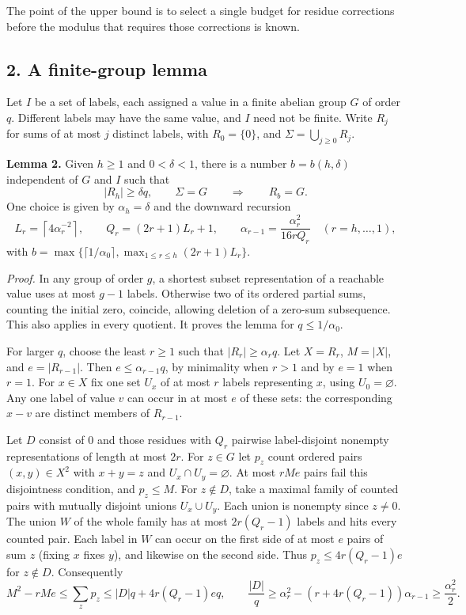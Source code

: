 \documentclass[
  11pt,
]{article}
\begin{document}
The point of the upper bound is to select a single budget for residue
corrections before the modulus that requires those corrections is known.

\subsection{2. A finite-group lemma}\label{a-finite-group-lemma}

Let \(I\) be a set of labels, each assigned a value in a finite abelian
group \(G\) of order \(q\). Different labels may have the same value,
and \(I\) need not be finite. Write \(R_j\) for sums of at most \(j\)
distinct labels, with \(R_0=\{0\}\), and \(\Sigma=\bigcup_{j\ge0}R_j\).

\textbf{Lemma 2.} Given \(h\ge1\) and \(0<\delta<1\), there is a number
\(b=b(h,\delta)\) independent of \(G\) and \(I\) such that \[
|R_h|\ge\delta q,\qquad \Sigma=G\qquad\Longrightarrow\qquad R_b=G.
\] One choice is given by \(\alpha_h=\delta\) and the downward recursion
\[
L_r=\left\lceil4\alpha_r^{-2}\right\rceil,\qquad
Q_r=(2r+1)L_r+1,\qquad
\alpha_{r-1}=\frac{\alpha_r^2}{16rQ_r}\quad(r=h,\ldots,1),
\] with
\(b=\max\{\lceil1/\alpha_0\rceil,\max_{1\le r\le h}(2r+1)L_r\}\).

\emph{Proof.} In any group of order \(g\), a shortest subset
representation of a reachable value uses at most \(g-1\) labels.
Otherwise two of its ordered partial sums, counting the initial zero,
coincide, allowing deletion of a zero-sum subsequence. This also applies
in every quotient. It proves the lemma for \(q\le1/\alpha_0\).

For larger \(q\), choose the least \(r\ge1\) such that
\(|R_r|\ge\alpha_r q\). Let \(X=R_r\), \(M=|X|\), and \(e=|R_{r-1}|\).
Then \(e\le\alpha_{r-1}q\), by minimality when \(r>1\) and by \(e=1\)
when \(r=1\). For \(x\in X\) fix one set \(U_x\) of at most \(r\) labels
representing \(x\), using \(U_0=\varnothing\). Any one label of value
\(v\) can occur in at most \(e\) of these sets: the corresponding
\(x-v\) are distinct members of \(R_{r-1}\).

Let \(D\) consist of \(0\) and those residues with \(Q_r\) pairwise
label-disjoint nonempty representations of length at most \(2r\). For
\(z\in G\) let \(p_z\) count ordered pairs \((x,y)\in X^2\) with
\(x+y=z\) and \(U_x\cap U_y=\varnothing\). At most \(rMe\) pairs fail
this disjointness condition, and \(p_z\le M\). For \(z\notin D\), take a
maximal family of counted pairs with mutually disjoint unions
\(U_x\cup U_y\). Each union is nonempty since \(z\ne0\). The union \(W\)
of the whole family has at most \(2r(Q_r-1)\) labels and hits every
counted pair. Each label in \(W\) can occur on the first side of at most
\(e\) pairs of sum \(z\) (fixing \(x\) fixes \(y\)), and likewise on the
second side. Thus \(p_z\le4r(Q_r-1)e\) for \(z\notin D\). Consequently
\[
M^2-rMe\le\sum_zp_z\le |D|q+4r(Q_r-1)eq,\qquad
\frac{|D|}{q}\ge \alpha_r^2-(r+4r(Q_r-1))\alpha_{r-1}
\ge\frac{\alpha_r^2}{2}.
\]
\end{document}
